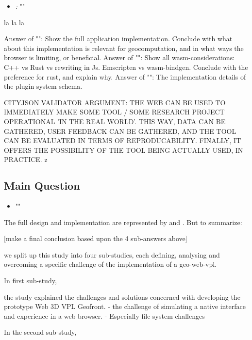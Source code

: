 \begin{itemize}[ ]
  \item \emph{\mySubRQFourTitle:} "\mySubRQFour"
\end{itemize}

la la la

\subitem Answer of "\mySubRQOneTitle": Show the full application implementation. Conclude with what about this implementation is relevant for geocomputation, and in what ways the browser is limiting, or beneficial. 
\subitem Answer of "\mySubRQTwoTitle": Show all wasm-considerations: C++ vs Rust vs rewriting in Js. Emscripten vs wasm-bindgen. Conclude with the preference for rust, and explain why.
\subitem Answer of "\mySubRQThreeTitle": The implementation details of the plugin system schema. 


CITYJSON VALIDATOR ARGUMENT: THE WEB CAN BE USED TO IMMEDIATELY MAKE SOME TOOL / SOME RESEARCH PROJECT OPERATIONAL 'IN THE REAL WORLD'. THIS WAY, DATA CAN BE GATHERED, USER FEEDBACK CAN BE GATHERED, AND THE TOOL CAN BE EVALUATED IN TERMS OF REPRODUCABILITY. FINALLY, IT OFFERS THE POSSIBILITY OF THE TOOL BEING ACTUALLY USED, IN PRACTICE. 
z

\subsection*{Main Question}

\begin{itemize}[ ]
    \item "\myMainRQ"
\end{itemize}

The full design and implementation are represented by  and . 
But to summarize:

[make a final conclusion based upon the 4 sub-answers above]

we split up this study into four sub-studies, each defining, analysing and overcoming a specific challenge of the implementation of a \ac{geo-web-vpl}.

In first sub-study, 

the study explained the challenges and solutions concerned with developing the prototype Web 3D VPL Geofront.
- the challenge of simulating a native interface and experience in a web browser. 
- Especially file system challenges 

In the second sub-study,

